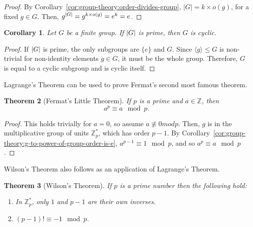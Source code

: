 \documentclass[12pt]{report}
\newcommand{\Z}{\mathbb{Z}}
\newtheorem{theorem}{Theorem}[section] %
\newtheorem{corollary}[theorem]{Corollary}
\theoremstyle{definition}
\begin{document}
\begin{proof}
  By Corollary~\ref{cor:group-theory:order-divides-group}, \(|G| = k \times o(g)\), for a fixed \(g \in G\).
  Then, \(g^{\abs{G}} = g^{k \times o(g)} = e^{k} = e\).
\end{proof}

\begin{corollary}
  Let \(G\) be a finite group.
  If \(\abs{G}\) is prime, then \(G\) is cyclic.
\end{corollary}

\begin{proof}
  If \(\abs{G}\) is prime, the only subgroups are \(\{e\}\) and \(G\).
  Since \(\langle g \rangle \leq G\) is non-trivial for non-identity elements \(g \in G\), it must be the whole group.
  Therefore, \(G\) is equal to a cyclic subgroup and is cyclic itself.
\end{proof}


Lagrange's Theorem can be used to prove Fermat's second most famous theorem.

\begin{theorem}[Fermat's Little Theorem]
 \label{thm:group-theory:fermats-little-theorem}
 If \(p\) is a prime and \(a \in \Z\), then
 \[a^{p} \equiv a \mod p.\]
\end{theorem}

\begin{proof}
  This holds trivially for \(a = 0\), so assume \(a \not\equiv 0 mod p\).
  Then, \(g\) is in the multiplicative group of units \(\Z^{*}_{p}\), which has order \(p-1\). By Corollary~\ref{cor:group-theory:g-to-power-of-group-order-is-e}, \(a^{p-1} \equiv 1 \mod p\), and so \(a^{p} \equiv a \mod p\).
\end{proof}

Wilson's Theorem also follows as an application of Lagrange's Theorem.

\begin{theorem}[Wilson's Theorem]
  \label{thm:group-theory:wilsons-theorem}
  If \(p\) is a prime number then the following hold:
  \begin{enumerate}
  \item
    In \(\Z^{*}_{p}\), only \(1\) and \(p-1\) are their own inverses.
  \item
    \((p - 1)! \equiv -1 \mod p\).
  \end{enumerate}
\end{theorem}
\end{document}
